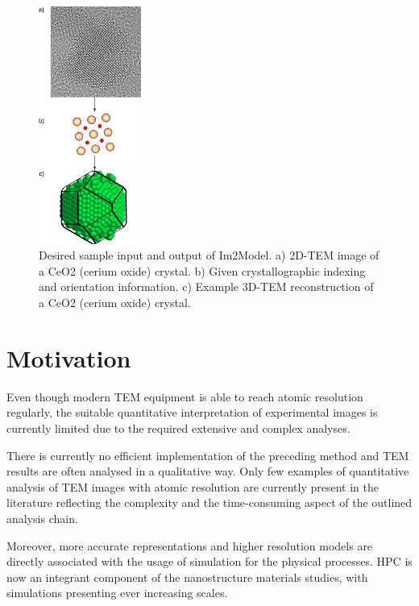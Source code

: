 \documentclass[
  oneside,
  11pt, a4paper,
  footinclude=true,
  headinclude=true,
  cleardoublepage=empty
]{scrbook}
\begin{document}
\begin{figure}[h!]
	\begin{center}
	
	\includegraphics[width=0.3\textwidth]{img/Im2Model_goal.png}
			\caption[Desired sample input and output of Im2Model]{Desired sample input and output of Im2Model.\splitter
			\newline
			a) 2D-TEM image of a CeO2 (cerium oxide) crystal.\newline
			b) Given crystallographic indexing and orientation information.\newline
			c) Example 3D-TEM reconstruction of a CeO2 (cerium oxide) crystal.}
	\label{fig:tem_2_atom_Ce02}
		\end{center}
	\end{figure}
	
 






	\section{Motivation}
	
	Even though modern TEM equipment is able to reach atomic
resolution regularly, the suitable quantitative interpretation of experimental images is currently limited
due to the required extensive and complex analyses.\par 

	There is currently no efficient implementation of the preceding method and TEM results are often analysed in a
qualitative way. 
Only few examples of quantitative analysis of TEM images with atomic resolution are
currently present in the literature %
reflecting the complexity and the time-consuming aspect of the
outlined analysis chain.\par 
Moreover, more accurate representations and higher resolution models are directly associated with the usage of simulation for the physical processes. HPC is now an integrant component of the nanostructure materials studies, with simulations presenting ever increasing scales.\pr
\end{document}

